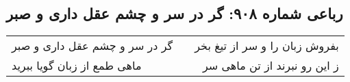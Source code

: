 \begin{center}
\section*{رباعی شماره ۹۰۸: گر در سر و چشم عقل داری و صبر}
\label{sec:0908}
\begin{longtable}{l p{0.5cm} r}
گر در سر و چشم عقل داری و صبر
&&
بفروش زبان را و سر از تیغ بخر
\\
ماهی طمع از زبان گویا ببرید
&&
ز این رو نبرند از تن ماهی سر
\\
\end{longtable}
\end{center}
